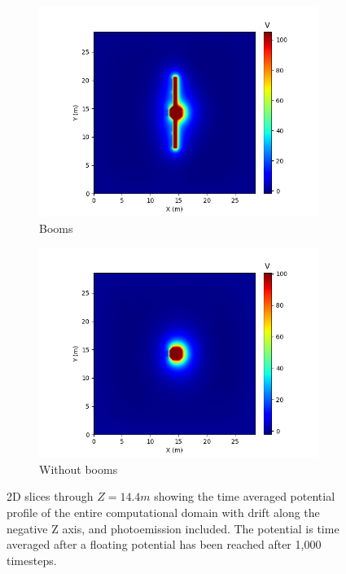 \begin{figure}[H]
  \begin{subfigure}[b]{0.6\textwidth}
    \includegraphics[width=\textwidth]{figures/MMO/minZ/WB/P_minZ_WB.png}
    \caption{Booms}
    \label{fig:P_minZ_WB}
  \end{subfigure}
  \hfill
  \begin{subfigure}[b]{0.6\textwidth}
    \includegraphics[width=\textwidth]{figures/MMO/minZ/NB/P_minZ_NB.png}
    \caption{Without booms}
    \label{fig:P_minZ_NB}
  \end{subfigure}
  \caption{2D slices through $Z = 14.4 m$ showing the time averaged potential profile of the entire computational domain with drift along the negative Z axis, and photoemission included. The potential is time averaged after a floating potential has been reached after 1,000 timesteps.}
\label{fig:Pot_minZ}
\end{figure}


